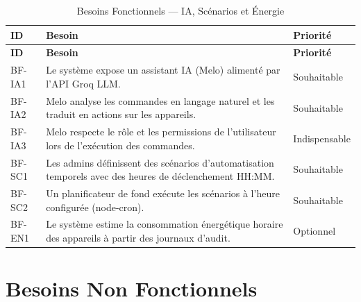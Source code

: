 \begin{longtable}{p{} p{} p{}}
\caption{Besoins Fonctionnels --- IA, Scénarios et Énergie}\label{tab:bf_ai}\\
\toprule
\textbf{ID} & \textbf{Besoin} & \textbf{Priorité} \\
\midrule
\endfirsthead
\toprule
\textbf{ID} & \textbf{Besoin} & \textbf{Priorité} \\
\midrule
\endhead
\bottomrule
\endfoot
BF-IA1 & Le système expose un assistant IA (Melo) alimenté par l'API Groq LLM. & Souhaitable \\
BF-IA2 & Melo analyse les commandes en langage naturel et les traduit en actions sur les appareils. & Souhaitable \\
BF-IA3 & Melo respecte le rôle et les permissions de l'utilisateur lors de l'exécution des commandes. & Indispensable \\
BF-SC1 & Les admins définissent des scénarios d'automatisation temporels avec des heures de déclenchement HH:MM. & Souhaitable \\
BF-SC2 & Un planificateur de fond exécute les scénarios à l'heure configurée (node-cron). & Souhaitable \\
BF-EN1 & Le système estime la consommation énergétique horaire des appareils à partir des journaux d'audit. & Optionnel \\
\end{longtable}

\section{Besoins Non Fonctionnels}

